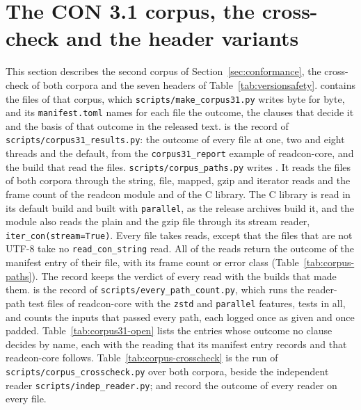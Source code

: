 \documentclass[preprint,12pt]{elsarticle}
\begin{document}
\FloatBarrier \section{The CON 3.1 corpus, the cross-check and the header variants}\label{sec:supp-corpus31} This section describes the second corpus of Section~\ref{sec:conformance}, the cross-check of both corpora and the seven headers of Table~\ref{tab:versionsafety}.
 contains the \cthreeoneFiles{} files of that corpus, which \texttt{scripts/\allowbreak make\_corpus31.py} writes byte for byte, and its \texttt{manifest.toml} names for each file the outcome, the clauses that decide it and the basis of that outcome in the released text.
 is the record of \texttt{scripts/\allowbreak corpus31\_results.py}: the outcome of every file at one, two and eight threads and the default, from the \texttt{corpus31\_report} example of readcon-core, and the build that read the files.
\texttt{scripts/\allowbreak corpus\_paths.py} writes .
It reads the \cpathsFiles{} files of both corpora through the string, file, mapped, gzip and iterator reads and the frame count of the readcon module and of the C library.
The C library is read in its default build and built with \texttt{parallel}, as the release archives build it, and the module also reads the plain and the gzip file through its stream reader, \texttt{iter\_con(stream=True)}.
Every file takes \cpathsReadKinds{} reads, except that the \cpathsNotText{} files that are not UTF-8 take no \texttt{read\_con\_string} read.
All \cpathsMatch{} of the \cpathsReads{} reads return the outcome of the manifest entry of their file, with its frame count or error class (Table~\ref{tab:corpus-paths}).
The record keeps the verdict of every read with the builds that made them.
 is the record of \texttt{scripts/\allowbreak every\_path\_count.py}, which runs the \everyPathTestFiles{} reader-path test files of readcon-core with the \texttt{zstd} and \texttt{parallel} features, \everyPathTests{} tests in all, and counts the \everyPathInputs{} inputs that passed every path, each logged once as given and once padded.
Table~\ref{tab:corpus31-open} lists the \cthreeoneNotExplicit{} entries whose outcome no clause decides by name, each with the reading that its manifest entry records and that readcon-core follows.
Table~\ref{tab:corpus-crosscheck} is the run of \texttt{scripts/\allowbreak corpus\_crosscheck.py} over both corpora, beside the independent reader \texttt{scripts/\allowbreak indep\_reader.py};  and  record the outcome of every reader on every file.
\end{document}
